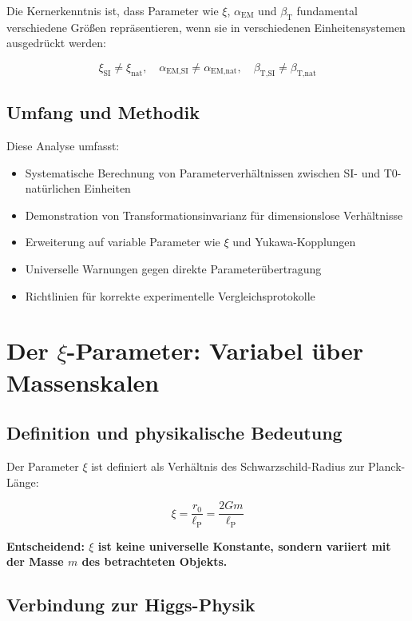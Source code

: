 \documentclass[12pt,a4paper]{article}
\newcommand{\xipar}{\xi}
\newcommand{\lP}{\ell_{\text{P}}}
\newcommand{\alphaEMSI}{\alpha_{\text{EM,SI}}}
\newcommand{\alphaEMnat}{\alpha_{\text{EM,nat}}}
\newcommand{\betaTSI}{\beta_{\text{T,SI}}}
\newcommand{\betaTnat}{\beta_{\text{T,nat}}}
\begin{document}
	Die Kernerkenntnis ist, dass Parameter wie $\xipar$, $\alpha_{\text{EM}}$ und $\beta_{\text{T}}$ fundamental verschiedene Größen repräsentieren, wenn sie in verschiedenen Einheitensystemen ausgedrückt werden:
	
	$$\xipar_{\text{SI}} \neq \xipar_{\text{nat}}, \quad \alphaEMSI \neq \alphaEMnat, \quad \betaTSI \neq \betaTnat$$
	
	\subsection{Umfang und Methodik}
	\label{subsec:umfang}
	
	Diese Analyse umfasst:
	\begin{itemize}
		\item Systematische Berechnung von Parameterverhältnissen zwischen SI- und T0-natürlichen Einheiten
		\item Demonstration von Transformationsinvarianz für dimensionslose Verhältnisse
		\item Erweiterung auf variable Parameter wie $\xipar$ und Yukawa-Kopplungen
		\item Universelle Warnungen gegen direkte Parameterübertragung
		\item Richtlinien für korrekte experimentelle Vergleichsprotokolle
	\end{itemize}
	
	\section{Der $\xipar$-Parameter: Variabel über Massenskalen}
	\label{sec:xi_parameter}
	
	\subsection{Definition und physikalische Bedeutung}
	\label{subsec:xi_definition}
	
	Der Parameter $\xipar$ ist definiert als Verhältnis des Schwarzschild-Radius zur Planck-Länge:
	
	\begin{equation}
		\xipar = \frac{r_0}{\lP} = \frac{2Gm}{\lP}
		\label{eq:xi_definition}
	\end{equation}
	
	\textbf{Entscheidend: $\xipar$ ist keine universelle Konstante, sondern variiert mit der Masse $m$ des betrachteten Objekts.}
	
	\subsection{Verbindung zur Higgs-Physik}
	\label{subsec:xi_higgs_verbindung}
	
\end{document}
